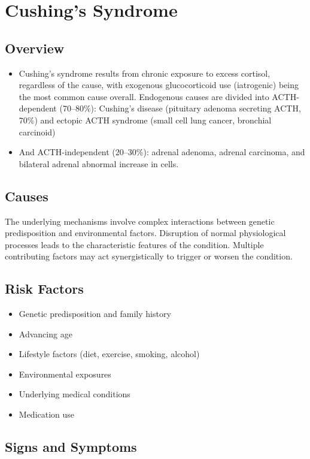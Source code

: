 \chapter{Cushing's Syndrome}
\label{sec:Cushing's Syndrome}

\section{Overview}


\begin{itemize}[noitemsep]
  \item Cushing's syndrome results from chronic exposure to excess cortisol, regardless of the cause, with exogenous glucocorticoid use (iatrogenic) being the most common cause overall. Endogenous causes are divided into ACTH-dependent (70--80\%): Cushing's disease (pituitary adenoma secreting ACTH, 70\%) and ectopic ACTH syndrome (small cell lung cancer, bronchial carcinoid)
  \item And ACTH-independent (20--30\%): adrenal adenoma, adrenal carcinoma, and bilateral adrenal abnormal increase in cells.
\end{itemize}
\section{Causes}
The underlying mechanisms involve complex interactions between genetic predisposition and environmental factors. Disruption of normal physiological processes leads to the characteristic features of the condition. Multiple contributing factors may act synergistically to trigger or worsen the condition.
\section{Risk Factors}


\begin{itemize}[noitemsep]
  \item Genetic predisposition and family history
  \item Advancing age
  \item Lifestyle factors (diet, exercise, smoking, alcohol)
  \item Environmental exposures
  \item Underlying medical conditions
  \item Medication use
\end{itemize}
\section{Signs and Symptoms}

